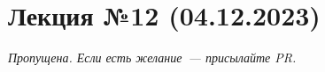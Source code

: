 \section{Лекция №12 (04.12.2023)}

\vspace*{\fill}
\begin{center}
    \textit{Пропущена. Если есть желание~--- присылайте PR.}
\end{center}
\vspace*{\fill}